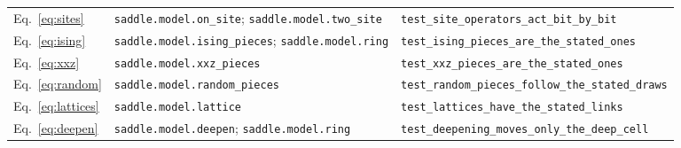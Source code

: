 \begin{tabular}{lp{2.55in}p{3.15in}}
Eq.~\eqref{eq:sites} & \raggedright \texttt{saddle.\allowbreak{}model.\allowbreak{}on\_\allowbreak{}site}; \texttt{saddle.\allowbreak{}model.\allowbreak{}two\_\allowbreak{}site} & \raggedright \texttt{test\_\allowbreak{}site\_\allowbreak{}operators\_\allowbreak{}act\_\allowbreak{}bit\_\allowbreak{}by\_\allowbreak{}bit} \tabularnewline
Eq.~\eqref{eq:ising} & \raggedright \texttt{saddle.\allowbreak{}model.\allowbreak{}ising\_\allowbreak{}pieces}; \texttt{saddle.\allowbreak{}model.\allowbreak{}ring} & \raggedright \texttt{test\_\allowbreak{}ising\_\allowbreak{}pieces\_\allowbreak{}are\_\allowbreak{}the\_\allowbreak{}stated\_\allowbreak{}ones} \tabularnewline
Eq.~\eqref{eq:xxz} & \raggedright \texttt{saddle.\allowbreak{}model.\allowbreak{}xxz\_\allowbreak{}pieces} & \raggedright \texttt{test\_\allowbreak{}xxz\_\allowbreak{}pieces\_\allowbreak{}are\_\allowbreak{}the\_\allowbreak{}stated\_\allowbreak{}ones} \tabularnewline
Eq.~\eqref{eq:random} & \raggedright \texttt{saddle.\allowbreak{}model.\allowbreak{}random\_\allowbreak{}pieces} & \raggedright \texttt{test\_\allowbreak{}random\_\allowbreak{}pieces\_\allowbreak{}follow\_\allowbreak{}the\_\allowbreak{}stated\_\allowbreak{}draws} \tabularnewline
Eq.~\eqref{eq:lattices} & \raggedright \texttt{saddle.\allowbreak{}model.\allowbreak{}lattice} & \raggedright \texttt{test\_\allowbreak{}lattices\_\allowbreak{}have\_\allowbreak{}the\_\allowbreak{}stated\_\allowbreak{}links} \tabularnewline
Eq.~\eqref{eq:deepen} & \raggedright \texttt{saddle.\allowbreak{}model.\allowbreak{}deepen}; \texttt{saddle.\allowbreak{}model.\allowbreak{}ring} & \raggedright \texttt{test\_\allowbreak{}deepening\_\allowbreak{}moves\_\allowbreak{}only\_\allowbreak{}the\_\allowbreak{}deep\_\allowbreak{}cell} \tabularnewline
\bottomrule
\end{tabular}
